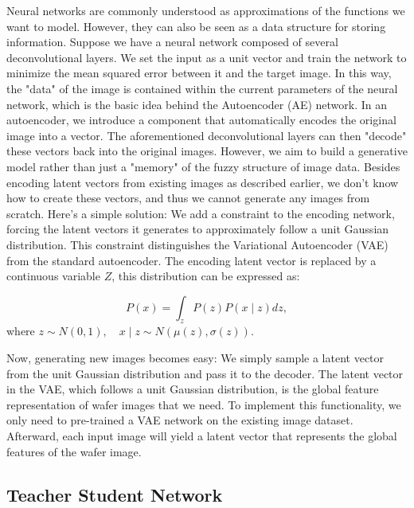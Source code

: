 \documentclass[conference]{IEEEtran}
\begin{document}
Neural networks are commonly understood as approximations of the functions we want to model. However, they can also be seen as a data structure for storing information. Suppose we have a neural network composed of several deconvolutional layers. We set the input as a unit vector and train the network to minimize the mean squared error between it and the target image. In this way, the "data" of the image is contained within the current parameters of the neural network, which is the basic idea behind the Autoencoder (AE) network.
In an autoencoder, we introduce a component that automatically encodes the original image into a vector. The aforementioned deconvolutional layers can then "decode" these vectors back into the original images. However, we aim to build a generative model rather than just a "memory" of the fuzzy structure of image data. Besides encoding latent vectors from existing images as described earlier, we don't know how to create these vectors, and thus we cannot generate any images from scratch. Here's a simple solution: We add a constraint to the encoding network, forcing the latent vectors it generates to approximately follow a unit Gaussian distribution. This constraint distinguishes the Variational Autoencoder (VAE) from the standard autoencoder. The encoding latent vector is replaced by a continuous variable $Z$, this distribution can be expressed as:

\begin{equation}
\label{equ:1}
P(x)=\int_{z} P(z) P(x \mid z) d z,
\end{equation} 
%
where $z \sim N(0,1), \quad x \mid z \sim N(\mu(z), \sigma(z))$.

Now, generating new images becomes easy: We simply sample a latent vector from the unit Gaussian distribution and pass it to the decoder. The latent vector in the VAE, which follows a unit Gaussian distribution, is the global feature representation of wafer images that we need. To implement this functionality, we only need to pre-trained a VAE network on the existing image dataset. Afterward, each input image will yield a latent vector that represents the global features of the wafer image.

\subsection{Teacher Student Network}
\end{document}
